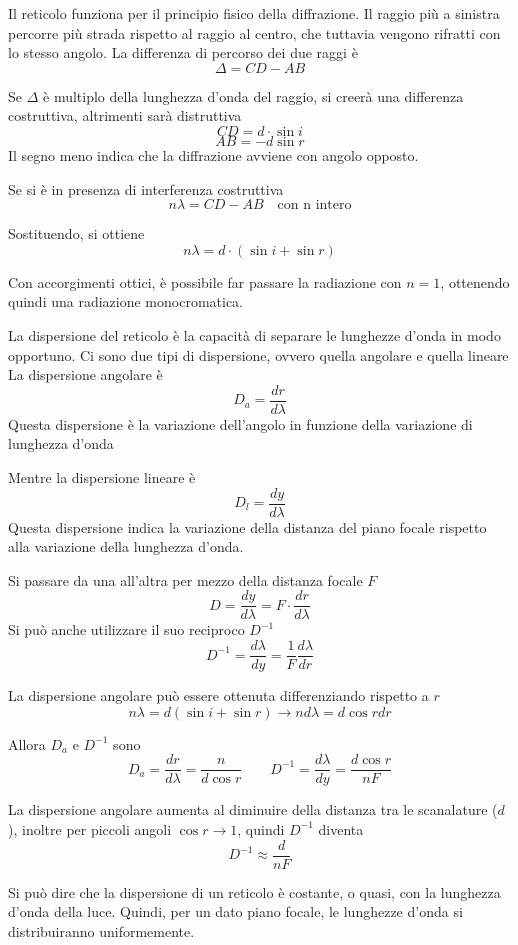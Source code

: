 
Il reticolo funziona per il principio fisico della diffrazione.
Il raggio più a sinistra percorre più strada rispetto al raggio al centro, che tuttavia vengono rifratti con lo stesso angolo.
La differenza di percorso dei due raggi è
\[
\Delta = CD - AB
\]

Se $\Delta$ è multiplo della lunghezza d'onda del raggio, si creerà una differenza costruttiva, altrimenti sarà distruttiva
\[
CD = d \cdot \sin i
\]
\[
AB = - d \sin r
\]
Il segno meno indica che la diffrazione avviene con angolo opposto.

Se si è in presenza di interferenza costruttiva
\[
n \lambda = CD - AB \quad \text{con n intero}
\]

Sostituendo, si ottiene
\[
n \lambda = d \cdot (\sin i + \sin r)
\]

Con accorgimenti ottici, è possibile far passare la radiazione con $n = 1$, ottenendo quindi una radiazione monocromatica.

La dispersione del reticolo è la capacità di separare le lunghezze d'onda in modo opportuno. Ci sono due tipi di dispersione, ovvero quella angolare e quella lineare
La dispersione angolare è 
\[
D_a = \frac{dr}{d\lambda}
\]
Questa dispersione è la variazione dell'angolo in funzione della variazione di lunghezza d'onda

Mentre la dispersione lineare è
\[
D_l = \frac{dy}{d\lambda}
\]
Questa dispersione indica la variazione della distanza del piano focale rispetto alla variazione della lunghezza d'onda.

Si passare da una all'altra per mezzo della distanza focale $F$
\[
D = \frac{dy}{d\lambda} = F \cdot \frac{dr}{d\lambda}
\]
Si può anche utilizzare il suo reciproco $D^{-1}$
\[
D^{-1} = \frac{d\lambda}{dy} = \frac{1}{F} \frac{d\lambda}{dr}
\]

La dispersione angolare può essere ottenuta differenziando rispetto a $r$
\[
n \lambda = d (\sin i + \sin r) \longrightarrow n d\lambda = d \cos r dr
\]

Allora $D_a$ e $D^{-1}$ sono 
\[
D_a = \frac{dr}{d\lambda} = \frac{n}{d \cos r} \qquad D^{-1} = \frac{d \lambda}{dy} = \frac{d \cos r}{n F} 
\]
 
La dispersione angolare aumenta al diminuire della distanza tra le scanalature ($d$), inoltre per piccoli angoli $\cos r \to 1$, quindi $D^{-1}$ diventa
\[
D^{-1} \approx \frac{d}{n F} 
\]

Si può dire che la dispersione di un reticolo è costante, o quasi, con la lunghezza d'onda della luce.
Quindi, per un dato piano focale, le lunghezze d'onda si distribuiranno uniformemente.

